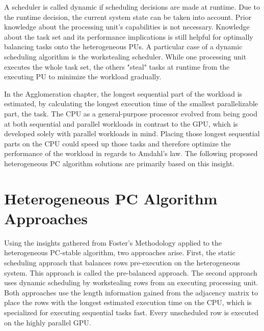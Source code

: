 A scheduler is called dynamic if scheduling decisions are made at runtime. Due to the runtime decision, the current system state can be taken into account. Prior knowledge about the processing unit's capabilities is not necessary. Knowledge about the task set and its performance implications is still helpful for optimally balancing tasks onto the heterogeneous PUs.
A particular case of a dynamic scheduling algorithm is the workstealing scheduler. While one processing unit executes the whole task set, the others "steal" tasks at runtime from the executing PU to minimize the workload gradually.

In the Agglomeration chapter, the longest sequential part of the workload is estimated, by calculating the longest execution time of the smallest parallelizable part, the task. The CPU as a general-purpose processor evolved from being good at both sequential and parallel workloads in contrast to the GPU, which is developed solely with parallel workloads in mind. Placing those longest sequential parts on the CPU could speed up those tasks and therefore optimize the performance of the workload in regards to Amdahl's law. The following proposed heterogeneous PC algorithm solutions are primarily based on this insight.

\section{Heterogeneous PC Algorithm Approaches}
Using the insights gathered from Foster's Methodology applied to the heterogeneous PC-stable algorithm, two approaches arise. First, the static scheduling approach that balances rows pre-execution on the heterogeneous system. This approach is called the pre-balanced approach. The second approach uses dynamic scheduling by workstealing rows from an executing processing unit. Both approaches use the length information gained from the adjacency matrix to place the rows with the longest estimated execution time on the CPU, which is specialized for executing sequential tasks fast. Every unscheduled row is executed on the highly parallel GPU.

